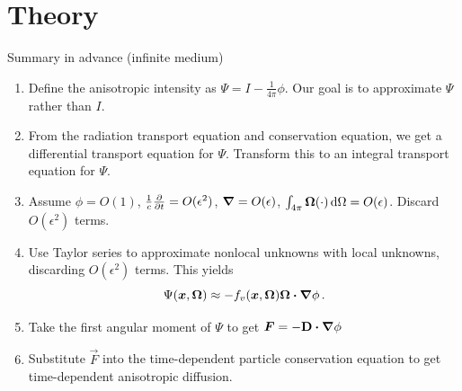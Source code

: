\documentclass{beamer}
\begin{document}
\section{Theory}
\begin{frame}{Summary in advance (infinite medium)}
\begin{enumerate}
  \item Define the anisotropic intensity as $\Psi = I - \frac{1}{4\pi}\phi$.
    Our goal is to approximate $\Psi$ rather than $I$.
  \item From the radiation transport equation and conservation equation, we get
    a differential transport equation for $\Psi$. Transform this to an integral
    transport equation for $\Psi$.
  \item Assume $\phi=O(1)$, $\frac1c\frac{\partial }{\partial t}=O(\epsilon^2)$, $\bm{\nabla} =
    O(\epsilon)$, $\int_{4\pi} \bm{\Omega} (\cdot) \mathop{}\!\mathrm{d} \Omega = O(\epsilon)$.
    Discard $O(\epsilon^2)$ terms.
  \item Use Taylor series to approximate nonlocal unknowns with local
    unknowns, discarding $O(\epsilon^2)$ terms. This yields
    \begin{equation*}
      \Psi(\bm{x}, \bm{\Omega})
      \approx - f_v(\bm{x}, \bm{\Omega})  \bm{\Omega} \bm{\cdot} \bm{\nabla} \phi\,.
    \end{equation*}
  \item Take the first angular moment of $\Psi$ to get $\bm{F}=-\mathbf{D} \bm{\cdot}
    \bm{\nabla} \phi$
  \item Substitute $\vec{F}$ into the time-dependent particle
    conservation equation to get time-dependent anisotropic diffusion.
\end{enumerate}
\end{frame}
\end{document}
